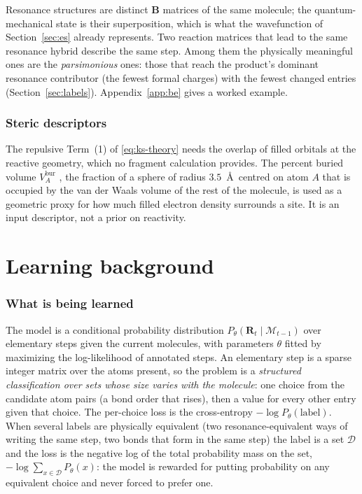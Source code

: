\documentclass[11pt,a4paper]{article}
\newcommand{\vb}[1]{\bm{#1}}
\begin{document}
Resonance structures are distinct $\vb{B}$ matrices of the same molecule; the quantum-mechanical state is their superposition, which is what the wavefunction of Section~\ref{sec:es} already represents. Two reaction matrices that lead to the same resonance hybrid describe the same step. Among them the physically meaningful ones are the \emph{parsimonious} ones: those that reach the product's dominant resonance contributor (the fewest formal charges) with the fewest changed entries (Section~\ref{sec:labels}). Appendix~\ref{app:be} gives a worked example.

\section{Steric descriptors}
The repulsive Term~(1) of \eqref{eq:ks-theory} needs the overlap of filled orbitals at the reactive geometry, which no fragment calculation provides. The percent buried volume $V^{\mathrm{bur}}_A$ \cite{vbur}, the fraction of a sphere of radius $3.5$~\AA\ centred on atom $A$ that is occupied by the van der Waals volume of the rest of the molecule, is used as a geometric proxy for how much filled electron density surrounds a site. It is an input descriptor, not a prior on reactivity.

\part{Learning background}

\section{What is being learned}
\label{sec:learn}
The model is a conditional probability distribution $P_\theta(\vb{R}_t\mid\mathcal{M}_{t-1})$ over elementary steps given the current molecules, with parameters $\theta$ fitted by maximizing the log-likelihood of annotated steps. An elementary step is a sparse integer matrix over the atoms present, so the problem is a \emph{structured classification over sets whose size varies with the molecule}: one choice from the candidate atom pairs (a bond order that rises), then a value for every other entry given that choice. The per-choice loss is the cross-entropy $-\log P_\theta(\text{label})$. When several labels are physically equivalent (two resonance-equivalent ways of writing the same step, two bonds that form in the same step) the label is a set $\mathcal{D}$ and the loss is the negative log of the total probability mass on the set, $-\log\sum_{x\in\mathcal{D}}P_\theta(x)$: the model is rewarded for putting probability on any equivalent choice and never forced to prefer one.
\end{document}
